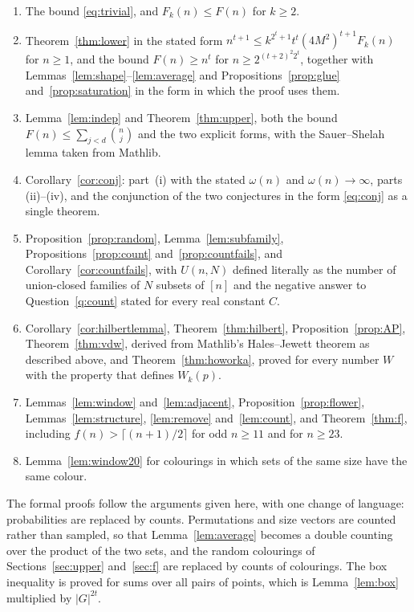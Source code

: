 \documentclass[11pt,reqno]{amsart}
\numberwithin{equation}{section}
\theoremstyle{plain}
\theoremstyle{definition}
\theoremstyle{remark}
\begin{document}
\begin{enumerate}[label=(\arabic*),leftmargin=2em]
\item The bound \eqref{eq:trivial}, and $F_k(n)\le F(n)$ for $k\ge2$.
\item Theorem~\ref{thm:lower} in the stated form
$n^{t+1}\le k^{2^{t}+1}t^{t}(4M^{2})^{t+1}F_k(n)$ for $n\ge1$, and the
bound $F(n)\ge n^{t}$ for $n\ge2^{(t+2)^{2}2^{t}}$, together with
Lemmas~\ref{lem:shape}--\ref{lem:average} and
Propositions~\ref{prop:glue} and~\ref{prop:saturation} in the form in
which the proof uses them.
\item Lemma~\ref{lem:indep} and Theorem~\ref{thm:upper}, both the bound
$F(n)\le\sum_{j<d}\binom nj$ and the two explicit forms, with the
Sauer--Shelah lemma taken from Mathlib.
\item Corollary~\ref{cor:conj}: part~(i) with the stated $\omega(n)$ and
$\omega(n)\to\infty$, parts (ii)--(iv), and the conjunction of the two
conjectures in the form \eqref{eq:conj} as a single theorem.
\item Proposition~\ref{prop:random}, Lemma~\ref{lem:subfamily},
Propositions~\ref{prop:count} and~\ref{prop:countfails}, and
Corollary~\ref{cor:countfails}, with $U(n,N)$ defined literally as the
number of union-closed families of $N$ subsets of $[n]$ and the negative
answer to Question~\ref{q:count} stated for every real constant $C$.
\item Corollary~\ref{cor:hilbertlemma}, Theorem~\ref{thm:hilbert},
Proposition~\ref{prop:AP}, Theorem~\ref{thm:vdw}, derived from Mathlib's
Hales--Jewett theorem as described above, and Theorem~\ref{thm:howorka},
proved for every number $W$ with the property that defines $W_k(p)$.
\item Lemmas~\ref{lem:window} and~\ref{lem:adjacent},
Proposition~\ref{prop:flower}, Lemmas~\ref{lem:structure},
\ref{lem:remove} and~\ref{lem:count}, and Theorem~\ref{thm:f}, including
$f(n)>\lceil(n+1)/2\rceil$ for odd $n\ge11$ and for $n\ge23$.
\item Lemma~\ref{lem:window20} for colourings in which sets of the same
size have the same colour.
\end{enumerate}

The formal proofs follow the arguments given here, with one change of
language: probabilities are replaced by counts. Permutations and size
vectors are counted rather than sampled, so that Lemma~\ref{lem:average}
becomes a double counting over the product of the two sets, and the
random colourings of Sections~\ref{sec:upper} and~\ref{sec:f} are
replaced by counts of colourings. The box inequality is proved for sums
over all pairs of points, which is Lemma~\ref{lem:box} multiplied by
$|G|^{2t}$.
\end{document}
